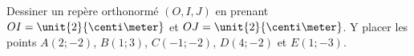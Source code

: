 
\begin{exercice}\label{exosmath-0480}

    Dessiner un repère orthonormé \( (O,I,J)\) en prenant \( OI=\unit{2}{\centi\meter}\) et \( OJ=\unit{2}{\centi\meter}\). Y placer les points \( A(2;-2)\), \( B(1;3)\), \( C(-1;-2)\), \( D(4;-2)\) et \( E(1;-3)\).

\end{exercice}

